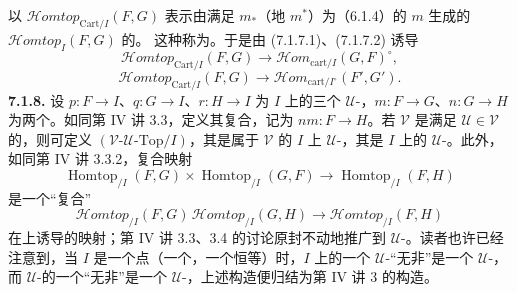 以 $\mathscr{H}\!omtop_{\mathrm{Cart}/I}(F,G)$ 表示由满足 $m_*$（地 $m^*$）为（6.1.4）的 $m$ 生成的 $\mathscr{H}\!omtop_I(F,G)$ 的。
这种称为。于是由 (7.1.7.1)、(7.1.7.2) 诱导
\[\mathscr{H}\!omtop_{\mathrm{Cart}/I}(F,G)\longrightarrow\mathscr{H}\!om_{\mathrm{cart}/I}(G,F)^\circ,\tag{7.1.7.3}\]
\[\mathscr{H}\!omtop_{\mathrm{Cart}/I}(F,G)\longrightarrow\mathscr{H}\!om_{\mathrm{cart}/I^\circ}(F',G').\tag{7.1.7.4}\]
\textbf{7.1.8.} 设 $p:F\to I$、$q:G\to I$、$r:H\to I$ 为 $I$ 上的三个 $\mathcal U$-，$m:F\to G$、$n:G\to H$ 为两个。如同第 IV 讲 3.3，定义其复合，记为 $nm:F\to H$。若 $\mathcal V$ 是满足 $\mathcal U\in\mathcal V$ 的，则可定义 $(\mathcal V\text{-}\mathcal U\text{-}\mathrm{Top}/I)$，其是属于 $\mathcal V$ 的 $I$ 上 $\mathcal U$-，其是 $I$ 上的 $\mathcal U$-。此外，如同第 IV 讲 3.3.2，复合映射
\[\operatorname{Homtop}_{/I}(F,G)\times\operatorname{Homtop}_{/I}(G,F)\longrightarrow\operatorname{Homtop}_{/I}(F,H)\]
是一个“复合”
\[\mathscr{H}\!omtop_{/I}(F,G)\,\mathscr{H}\!omtop_{/I}(G,H)\longrightarrow\mathscr{H}\!omtop_{/I}(F,H)\]
在上诱导的映射；第 IV 讲 3.3、3.4 的讨论原封不动地推广到 $\mathcal U$-。读者也许已经注意到，当 $I$ 是一个点（一个，一个恒等）时，$I$ 上的一个 $\mathcal U$-“无非”是一个 $\mathcal U$-，而 $\mathcal U$-的一个“无非”是一个 $\mathcal U$-，上述构造便归结为第 IV 讲 3 的构造。

